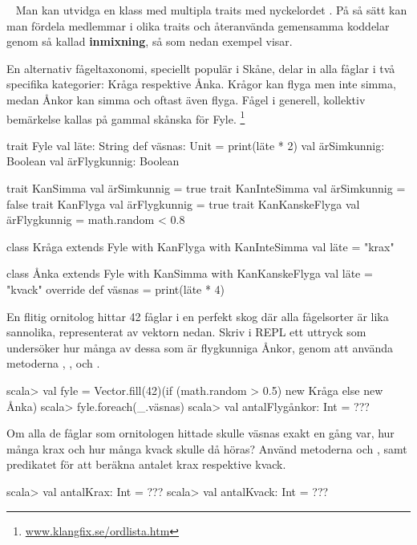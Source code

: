 
\QUESTBEGIN

\Task \label{task:fyle} \what~   Man kan utvidga en klass med multipla traits med nyckelordet . På så sätt kan man fördela medlemmar i olika traits och återanvända gemensamma koddelar genom så kallad \textbf{inmixning}, så som nedan exempel visar.

En alternativ fågeltaxonomi, speciellt populär i Skåne, delar in alla fåglar i två specifika kategorier: Kråga respektive Ånka. Krågor kan flyga men inte simma, medan Ånkor kan simma och oftast även flyga. Fågel i generell, kollektiv bemärkelse kallas på gammal skånska för Fyle.%
\footnote{\href{http://www.klangfix.se/ordlista.htm}{www.klangfix.se/ordlista.htm}}

\begin{Code}
trait Fyle {
  val läte: String
  def väsnas: Unit = print(läte * 2)
  val ärSimkunnig: Boolean
  val ärFlygkunnig: Boolean
}

trait KanSimma       { val ärSimkunnig = true }
trait KanInteSimma   { val ärSimkunnig = false }
trait KanFlyga       { val ärFlygkunnig = true }
trait KanKanskeFlyga { val ärFlygkunnig = math.random < 0.8 }

class Kråga extends Fyle with KanFlyga with KanInteSimma {
  val läte = "krax"
}

class Ånka extends Fyle with KanSimma with KanKanskeFlyga {
  val läte = "kvack"
  override def väsnas = print(läte * 4)
}
\end{Code}

\Subtask En flitig ornitolog hittar 42 fåglar i en perfekt skog där alla fågelsorter är lika sannolika, representerat av vektorn  nedan. Skriv i REPL ett uttryck som undersöker hur många av dessa som är flygkunniga Ånkor, genom att använda metoderna , ,  och .

\begin{REPL}
scala> val fyle =
         Vector.fill(42)(if (math.random > 0.5) new Kråga else new Ånka)
scala> fyle.foreach(_.väsnas)
scala> val antalFlygånkor: Int = ???
\end{REPL}

\Subtask \label{subtask:fyle:sound} Om alla de fåglar som ornitologen hittade skulle väsnas exakt en gång var, hur många krax och hur många kvack skulle då höras? Använd metoderna  och , samt predikatet  för att beräkna antalet krax respektive kvack.
\begin{REPL}
scala> val antalKrax: Int = ???
scala> val antalKvack: Int = ???
\end{REPL}

